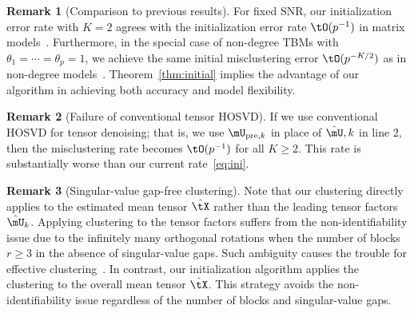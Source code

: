 \documentclass[lettersize,onecolumn,journal]{IEEEtran}
\theoremstyle{definition}
\newtheorem{thm}{Theorem}
\theoremstyle{definition}
\newtheorem{rmk}{Remark}
\begin{document}

\begin{rmk}[Comparison to previous results] For fixed SNR, our initialization error rate with $K=2$ agrees with the initialization error rate $\tO(p^{-1})$ in matrix models~\citep{gao2018community}. Furthermore, in the special case of non-degree TBMs with $\theta_1=\cdots=\theta_p=1$, we achieve the same initial misclustering error $\tO(p^{-K/2})$ as in non-degree models~\citep{han2020exact}. Theorem~\ref{thm:initial} implies the advantage of our algorithm in achieving both accuracy and model flexibility. 
\end{rmk}



\begin{rmk}[Failure of conventional tensor HOSVD] If we use conventional HOSVD for tensor denoising; that is, we use $\mU_{\text{pre},k}$ in place of $\hat \mU,k$ in line 2, then the misclustering rate becomes $\tO(p^{-1})$ for all $K\geq 2$. This rate is substantially worse than our current rate~\eqref{eq:ini}.
\end{rmk}


\begin{rmk}[Singular-value gap-free clustering] Note that our clustering directly applies to the estimated mean tensor $\hat \tX$ rather than the leading tensor factors $\hat \mU_k$. Applying clustering to the tensor factors suffers from the non-identifiability issue due to the infinitely many orthogonal rotations when the number of blocks $r \geq 3$ in the absence of singular-value gaps. 
Such ambiguity causes the trouble for effective clustering~\citep{abbe2020entrywise}. In contrast, our initialization algorithm applies the clustering to the overall mean tensor $\hat \tX$. This strategy avoids the non-identifiability issue regardless of the number of blocks and singular-value gaps.  
\end{rmk}
\end{document}
